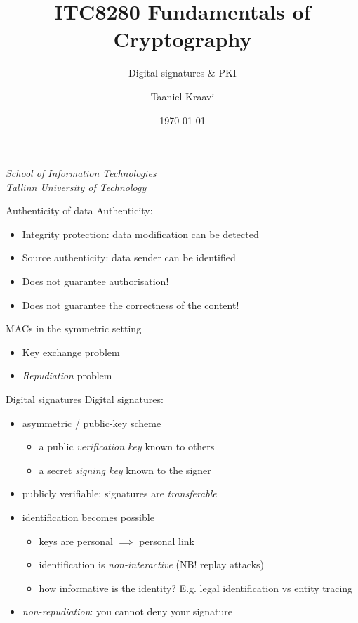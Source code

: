 \graphicspath{ {../../images/} }
\usetikzlibrary{external}
\usepackage{changepage}

\title{ITC8280 Fundamentals of Cryptography}
\subtitle{Digital signatures \& PKI}
\date{\today}
\author{Taaniel Kraavi}
\institute%
{%
  \textit{School of Information Technologies}\\
  \textit{Tallinn University of Technology}
}


\begin{frame}
  \titlepage
\end{frame}

\begin{frame}{Authenticity of data}
  Authenticity:
  \begin{itemize}[<+(1)->]
    \item Integrity protection: data modification can be detected
    \item Source authenticity: data sender can be identified
    \item Does not guarantee authorisation!
    \item Does not guarantee the correctness of the content!
  \end{itemize}

  \vspace*{1em}

  \pause
  MACs in the symmetric setting
  \begin{itemize}[<+(1)->]
    \item Key exchange problem
    \item \emph{Repudiation} problem
  \end{itemize}
\end{frame}

\begin{frame}{Digital signatures}
  Digital signatures:
  \begin{itemize}[<+(1)->]
    \item asymmetric / public-key scheme
    \begin{itemize}
      \item a public \emph{verification key} known to others
      \item a secret \emph{signing key} known to the signer
    \end{itemize}
    \item publicly verifiable: signatures are \emph{transferable}
    \item identification becomes possible
    \begin{itemize}
      \item keys are personal $\implies$ personal link
      \item identification is \emph{non-interactive} (NB! replay attacks)
      \item how informative is the identity? E.g. legal identification vs entity tracing
    \end{itemize}
    \item \emph{non-repudiation}: you cannot deny your signature
  \end{itemize}
\end{frame}

